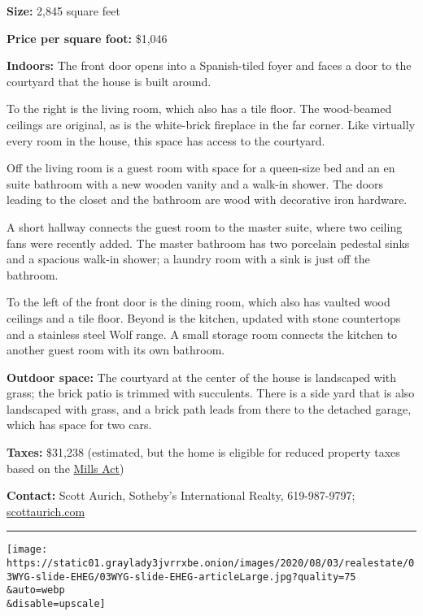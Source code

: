 \textbf{Size:} 2,845 square feet

\textbf{Price per square foot:} \$1,046

\textbf{Indoors:} The front door opens into a Spanish-tiled foyer and
faces a door to the courtyard that the house is built around.

To the right is the living room, which also has a tile floor. The
wood-beamed ceilings are original, as is the white-brick fireplace in
the far corner. Like virtually every room in the house, this space has
access to the courtyard.

Off the living room is a guest room with space for a queen-size bed and
an en suite bathroom with a new wooden vanity and a walk-in shower. The
doors leading to the closet and the bathroom are wood with decorative
iron hardware.

A short hallway connects the guest room to the master suite, where two
ceiling fans were recently added. The master bathroom has two porcelain
pedestal sinks and a spacious walk-in shower; a laundry room with a sink
is just off the bathroom.

To the left of the front door is the dining room, which also has vaulted
wood ceilings and a tile floor. Beyond is the kitchen, updated with
stone countertops and a stainless steel Wolf range. A small storage room
connects the kitchen to another guest room with its own bathroom.

\textbf{Outdoor space:} The courtyard at the center of the house is
landscaped with grass; the brick patio is trimmed with succulents. There
is a side yard that is also landscaped with grass, and a brick path
leads from there to the detached garage, which has space for two cars.

\textbf{Taxes:} \$31,238 (estimated, but the home is eligible for
reduced property taxes based on the
\href{http://www.ohp.parks.ca.gov/?page_id=21412}{Mills Act})

\textbf{Contact:} Scott Aurich, Sotheby's International Realty,
619-987-9797;
\href{https://www.scottaurich.com/properties/Listing_e2df4893-3e35-489f-ac7f-ad623e356c16--200+Palm+Avenue-Coronado-CA-92118_pacificsothebysfullsandicorcombined2d636fb1a6b45dcd02912b96ad8d6dfe.html}{scottaurich.com}

\begin{center}\rule{0.5\linewidth}{\linethickness}\end{center}

\texttt{[image: https://static01.graylady3jvrrxbe.onion/images/2020/08/03/realestate/03WYG-slide-EHEG/03WYG-slide-EHEG-articleLarge.jpg?quality=75\\\&auto=webp\\\&disable=upscale]}

